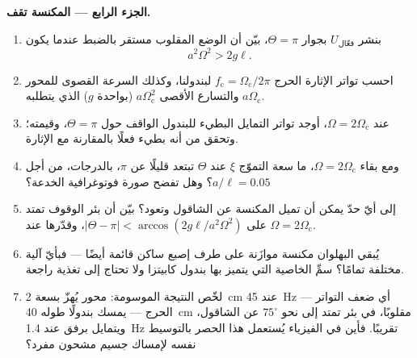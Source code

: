 \begin{problem}
\medskip\noindent\textbf{الجزء الرابع --- المكنسة تقف.}
\begin{enumerate}[resume]
  \item بنشر $U_{\text{فعّال}}$ بجوار $\Theta = \pi$، بيّن أن الوضع
        المقلوب مستقر بالضبط عندما يكون
        \[
        a^2\Omega^2 > 2g\ell .
        \]
  \item احسب تواتر الإثارة الحرج $f_{\text{c}} =
        \Omega_{\text{c}}/2\pi$ لبندولنا، وكذلك السرعة القصوى
        للمحور $a\Omega_{\text{c}}$ والتسارع الأقصى
        $a\Omega_{\text{c}}^2$ (بواحدة $g$) الذي يتطلبه.
  \item عند $\Omega = 2\Omega_{\text{c}}$، أوجد تواتر التمايل
        البطيء للبندول الواقف حول $\Theta = \pi$، وقيمته؛ وتحقق
        من أنه بطيء فعلًا بالمقارنة مع الإثارة.
  \item ومع بقاء $\Omega = 2\Omega_{\text{c}}$، ما سعة التموّج
        $\xi$ عند $\Theta$ تبتعد قليلًا عن $\pi$، بالدرجات، من
        أجل $a/\ell = 0.05$؟ وهل تفضح صورة فوتوغرافية الخدعة؟
  \item إلى أيّ حدّ يمكن أن تميل المكنسة عن الشاقول وتعود؟
        بيّن أن بئر الوقوف تمتد على $|\Theta - \pi| <
        \arccos(2g\ell/a^2\Omega^2)$، وقدّرها عند $\Omega =
        2\Omega_{\text{c}}$.
  \item يُبقي البهلوان مكنسة موازَنة على طرف إصبع ساكن قائمة
        أيضًا --- فبأيّ آلية مختلفة تمامًا؟ سمِّ الخاصية التي
        يتميز بها بندول كابيتزا ولا تحتاج إلى تغذية راجعة.
  \item لخّص النتيجة الموسومة: محور يُهزّ بسعة
        \qty{2}{cm} عند \qty{45}{Hz} --- أي ضعف التواتر الحرج ---
        يمسك بندولًا طوله \qty{40}{cm} مقلوبًا، في بئر تمتد إلى
        نحو $75^\circ$ عن الشاقول، ويتمايل برفق عند
        \qty{1.4}{Hz} تقريبًا. فأين في الفيزياء يُستعمل هذا
        الحصر بالتوسيط نفسه لإمساك جسيم مشحون مفرد؟
\end{enumerate}
\end{problem}
